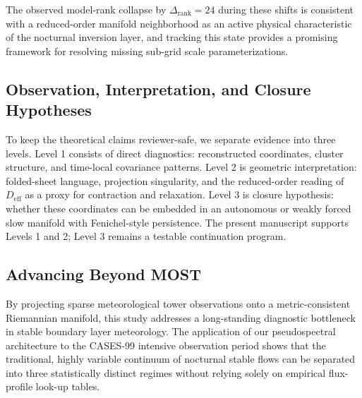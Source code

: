 The observed model-rank collapse by $\Delta_{\mathrm{rank}} = 24$ during these shifts is consistent with a reduced-order manifold neighborhood as an active physical characteristic of the nocturnal inversion layer, and tracking this state provides a promising framework for resolving missing sub-grid scale parameterizations.

\subsection{Observation, Interpretation, and Closure Hypotheses}

To keep the theoretical claims reviewer-safe, we separate evidence into three levels. Level 1 consists of direct diagnostics: reconstructed coordinates, cluster structure, and time-local covariance patterns. Level 2 is geometric interpretation: folded-sheet language, projection singularity, and the reduced-order reading of $D_{\mathrm{eff}}$ as a proxy for contraction and relaxation. Level 3 is closure hypothesis: whether these coordinates can be embedded in an autonomous or weakly forced slow manifold with Fenichel-style persistence. The present manuscript supports Levels 1 and 2; Level 3 remains a testable continuation program.

\subsection{Advancing Beyond MOST}

By projecting sparse meteorological tower observations onto a metric-consistent Riemannian manifold, this study addresses a long-standing diagnostic bottleneck in stable boundary layer meteorology. The application of our pseudospectral architecture to the CASES-99 intensive observation period shows that the traditional, highly variable continuum of nocturnal stable flows can be separated into three statistically distinct regimes without relying solely on empirical flux-profile look-up tables.

